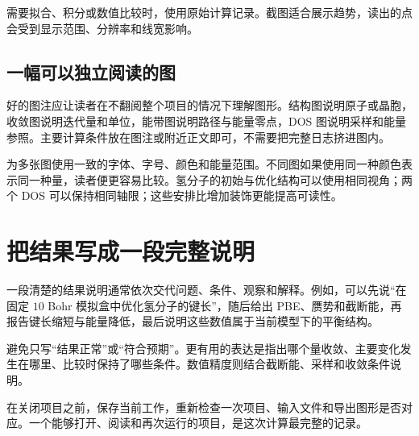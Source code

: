 需要拟合、积分或数值比较时，使用原始计算记录。截图适合展示趋势，读出的点会受到显示范围、分辨率和线宽影响。

\subsection{一幅可以独立阅读的图}

好的图注应让读者在不翻阅整个项目的情况下理解图形。结构图说明原子或晶胞，收敛图说明迭代量和单位，能带图说明路径与能量零点，DOS 图说明采样和能量参照。主要计算条件放在图注或附近正文即可，不需要把完整日志挤进图内。

为多张图使用一致的字体、字号、颜色和能量范围。不同图如果使用同一种颜色表示同一种量，读者便更容易比较。氢分子的初始与优化结构可以使用相同视角；两个 DOS 可以保持相同轴限；这些安排比增加装饰更能提高可读性。

\section{把结果写成一段完整说明}

一段清楚的结果说明通常依次交代问题、条件、观察和解释。例如，可以先说“在固定 $10$ Bohr 模拟盒中优化氢分子的键长”，随后给出 PBE、赝势和截断能，再报告键长缩短与能量降低，最后说明这些数值属于当前模型下的平衡结构。

避免只写“结果正常”或“符合预期”。更有用的表达是指出哪个量收敛、主要变化发生在哪里、比较时保持了哪些条件。数值精度则结合截断能、采样和收敛条件说明。

在关闭项目之前，保存当前工作，重新检查一次项目、输入文件和导出图形是否对应。一个能够打开、阅读和再次运行的项目，是这次计算最完整的记录。
